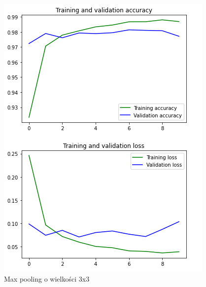 \documentclass{article}
\begin{document}
\begin{figure}[!htb]
  \centering
  \includegraphics[width=\linewidth]{pooling_max_3_3.png}
  \caption{Max pooling o wielkości 3x3}
\end{figure}
\end{document}

